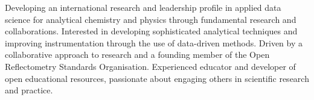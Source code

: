 \vspace{0.25cm}

\begin{cvparagraph}

Developing an international research and leadership profile in applied data science for analytical chemistry and physics through fundamental research and collaborations.
Interested in developing sophisticated analytical techniques and improving instrumentation through the use of data-driven methods.
Driven by a collaborative approach to research and a founding member of the Open Reflectometry Standards Organisation.
Experienced educator and developer of open educational resources, passionate about engaging others in scientific research and practice.
\end{cvparagraph}
